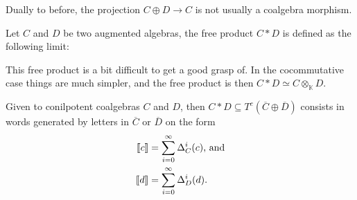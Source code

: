 \documentclass[../thesis.tex]{subfiles}
\begin{document}
                Dually to before, the projection $C \oplus D \rightarrow C$ is not usually a coalgebra morphism.

                \begin{definition}
                    Let $C$ and $D$ be two augmented algebras, the free product $C \ast D$ is defined as the following limit:
                    \begin{center}
                    \end{center}
                \end{definition}

                This free product is a bit difficult to get a good grasp of. In the cocommutative case things are much simpler, and the free product is then $C\ast D \simeq C \otimes_{\mathbb{K}} D$.

                \begin{lemma}
                    Given to conilpotent coalgebras $C$ and $D$, then $C\ast D \subseteq T^c(\overline{C}\oplus \overline{D})$ consists in words generated by letters in $\overline{C}$ or $\overline{D}$ on the form
                    \begin{align*}
                        \llbracket c \rrbracket & = \sum_{i=0}^\infty \Delta^i_C(c)\tt{, and}\\
                        \llbracket d \rrbracket & = \sum_{i=0}^\infty \Delta^i_D(d)\tt{.}
                    \end{align*} 
                \end{lemma}
\end{document}
